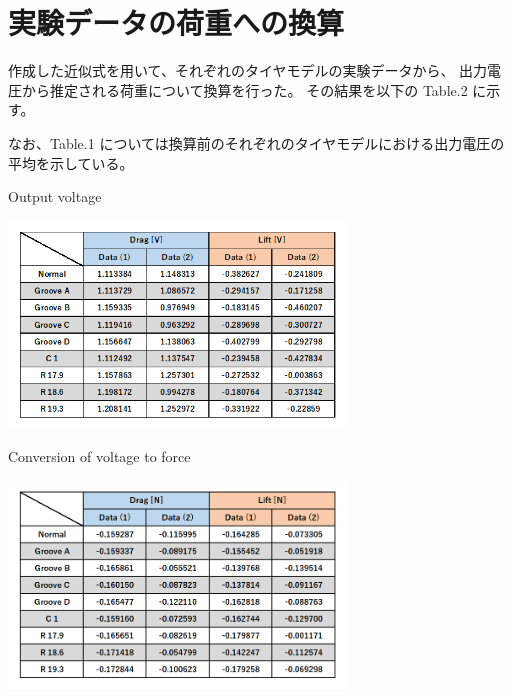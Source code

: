 \documentclass[twocolumn,a4j]{jsarticle}
\begin{document}
\section{実験データの荷重への換算}
作成した近似式を用いて、それぞれのタイヤモデルの実験データから、
出力電圧から推定される荷重について換算を行った。
その結果を以下の Table.2 に示す。\par
なお、Table.1 については換算前のそれぞれのタイヤモデルにおける出力電圧の平均を示している。
\begin{table}[htbp]
    \footnotesize
    \begin{center}
        \caption{Output voltage}
        \includegraphics[width=90mm]{../images/Table_1.png}
        \caption{Conversion of voltage to force}
        \includegraphics[width=90mm]{../images/Table_2.png}
    \end{center}
\end{table}
\end{document}
